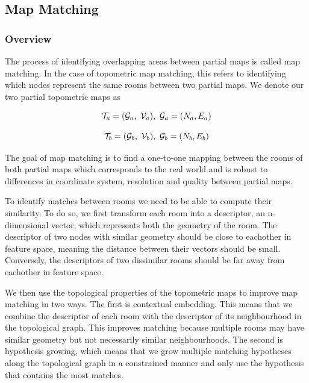 \subsection{Map Matching}

\subsubsection{Overview}
The process of identifying overlapping areas between partial maps is called map matching. In the case of topometric map matching, this refers to identifying which nodes represent the same rooms between two partial maps. We denote our two partial topometric maps as

\begin{equation}
    \label{eq:tmap_a}
    \topometricmap_a = (\mathcal{G}_a,\ \voxelgrid_a),\ \mathcal{G}_a=(N_a,E_a)
\end{equation}

\begin{equation}
    \label{eq:tmap_b}
    \topometricmap_b = (\mathcal{G}_b,\ \voxelgrid_b),\ \mathcal{G}_b=(N_b,E_b)
\end{equation}

The goal of map matching is to find a one-to-one mapping between the rooms of both partial maps which corresponds to the real world and is robust to differences in coordinate system, resolution and quality between partial maps. 

To identify matches between rooms we need to be able to compute their similarity. To do so, we first transform each room into a descriptor, an n-dimensional vector, which represents both the geometry of the room. The descriptor of two nodes with similar geometry should be close to eachother in feature space, meaning the distance between their vectors should be small. Conversely, the descriptors of two dissimilar rooms should be far away from eachother in feature space. 

We then use the topological properties of the topometric maps to improve map matching in two ways. The first is contextual embedding. This means that we combine the descriptor of each room with the descriptor of its neighbourhood in the topological graph. This improves matching because multiple rooms may have similar geometry but not necessarily similar neighbourhoods. The second is hypothesis growing, which means that we grow multiple matching hypotheses along the topological graph in a constrained manner and only use the hypothesis that contains the most matches. 

